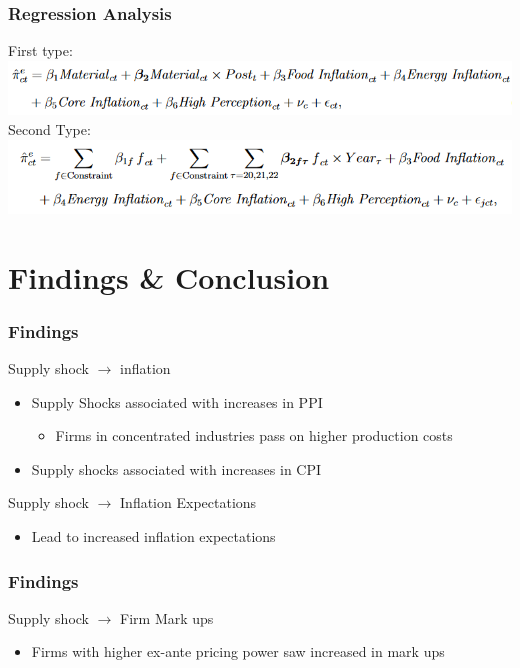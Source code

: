 \documentclass{beamer}
\newcommand{\bb}{\bigbreak\noindent}
\begin{document}
\begin{spacing}{1.5}
\begin{frame}
\end{frame}

\begin{frame}
	\frametitle{Regression Analysis}
	First type:\\
	\includegraphics[width=\textwidth]{postreg}
	\bb
	Second Type:\\
	\includegraphics[width=\textwidth]{yearreg}
	
\end{frame}


\section{Findings \& Conclusion}
\begin{frame}
	\frametitle{Findings}
	
	Supply shock $\rightarrow$ inflation
	\begin{itemize}
		\item Supply Shocks associated with increases in PPI
			\begin{itemize}
				\item Firms in concentrated industries pass on higher production costs
			\end{itemize}
		\item Supply shocks associated with increases in CPI
	\end{itemize}
	\bb
	Supply shock $\rightarrow$ Inflation Expectations
	\begin{itemize}
		\item Lead to increased inflation expectations
	\end{itemize}
		
\end{frame}

\begin{frame}
	\frametitle{Findings}
	
	Supply shock $\rightarrow$ Firm Mark ups
	\begin{itemize}
		\item Firms with higher ex-ante pricing power saw increased in mark ups
	\end{itemize}
	

\end{frame}
\end{spacing}
\end{document}
